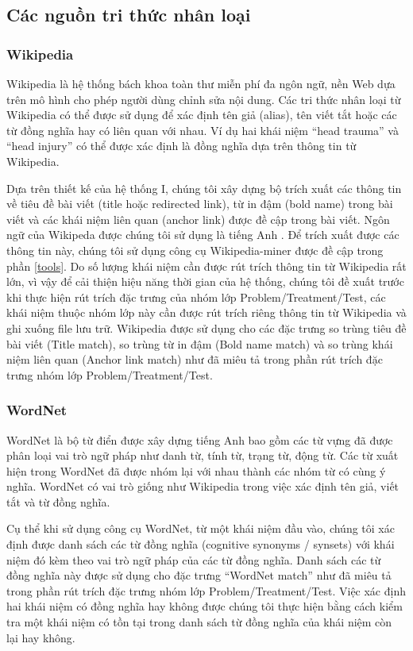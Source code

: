\subsection*{Các nguồn tri thức nhân loại}

\subsubsection*{Wikipedia}
Wikipedia là hệ thống bách khoa toàn thư miễn phí đa ngôn ngữ, nền Web dựa trên mô hình cho phép người dùng chỉnh sửa nội dung. Các tri thức nhân loại từ Wikipedia có thể được sử dụng để xác định tên giả (alias), tên viết tắt hoặc các từ đồng nghĩa hay có liên quan với nhau. Ví dụ hai khái niệm ``head trauma'' và ``head injury'' có thể được xác định là đồng nghĩa dựa trên thông tin từ Wikipedia.

Dựa trên thiết kế của hệ thống I, chúng tôi xây dựng bộ trích xuất các thông tin về tiêu đề bài viết (title hoặc redirected link), từ in đậm (bold name) trong bài viết và các khái niệm liên quan (anchor link) được đề cập trong bài viết. Ngôn ngữ của Wikipeda được chúng tôi sử dụng là tiếng Anh . Để trích xuất được các thông tin này, chúng tôi sử dụng công cụ Wikipedia-miner được đề cập trong phần \ref{tools}. Do số lượng khái niệm cần được rút trích thông tin từ Wikipedia rất lớn, vì vậy để cải thiện hiệu năng thời gian của hệ thống, chúng tôi đề xuất trước khi thực hiện rút trích đặc trưng của nhóm lớp Problem/Treatment/Test, các khái niệm thuộc nhóm lớp này cần được rút trích riêng thông tin từ Wikipedia và ghi xuống file lưu trữ. Wikipedia được sử dụng cho các đặc trưng so trùng tiêu đề bài viết (Title match), so trùng từ in đậm (Bold name match) và so trùng khái niệm liên quan (Anchor link match) như đã miêu tả trong phần rút trích đặc trưng nhóm lớp Problem/Treatment/Test.

\subsubsection*{WordNet}
WordNet là bộ từ điển được xây dựng tiếng Anh bao gồm các từ vựng đã được phân loại vai trò ngữ pháp như danh từ, tính từ, trạng từ, động từ. Các từ xuất hiện trong WordNet đã được nhóm lại với nhau thành các nhóm từ có cùng ý nghĩa. WordNet có vai trò giống như Wikipedia trong việc xác định tên giả, viết tắt và từ đồng nghĩa.

Cụ thể khi sử dụng công cụ WordNet, từ một khái niệm đầu vào, chúng tôi xác định được danh sách các từ đồng nghĩa (cognitive synonyms / synsets) với khái niệm đó kèm theo vai trò ngữ pháp của các từ đồng nghĩa. Danh sách các từ đồng nghĩa này được sử dụng cho đặc trưng ``WordNet match'' như đã miêu tả trong phần rút trích đặc trưng nhóm lớp Problem/Treatment/Test. Việc xác định hai khái niệm có đồng nghĩa hay không được chúng tôi thực hiện bằng cách kiểm tra một khái niệm có tồn tại trong danh sách từ đồng nghĩa của khái niệm còn lại hay không.

